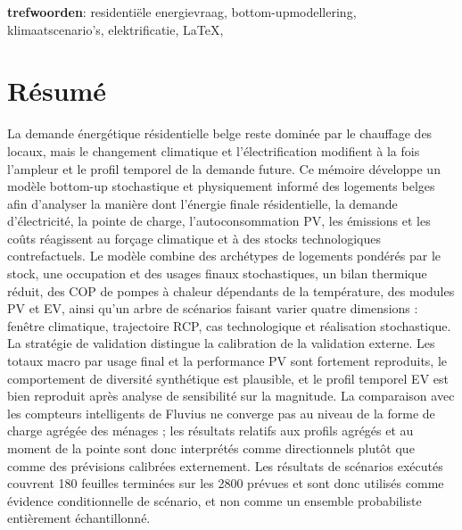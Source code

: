 \bigskip
\textbf{trefwoorden}: residentiële energievraag, bottom-upmodellering, klimaatscenario’s, elektrificatie, \LaTeX, \TikZ


\chapter*{R\'esum\'e}

La demande énergétique résidentielle belge reste dominée par le chauffage des locaux, mais le changement climatique et l’électrification modifient à la fois l’ampleur et le profil temporel de la demande future. Ce mémoire développe un modèle bottom-up stochastique et physiquement informé des logements belges afin d’analyser la manière dont l’énergie finale résidentielle, la demande d’électricité, la pointe de charge, l’autoconsommation PV, les émissions et les coûts réagissent au forçage climatique et à des stocks technologiques contrefactuels. Le modèle combine des archétypes de logements pondérés par le stock, une occupation et des usages finaux stochastiques, un bilan thermique réduit, des COP de pompes à chaleur dépendants de la température, des modules PV et EV, ainsi qu’un arbre de scénarios faisant varier quatre dimensions : fenêtre climatique, trajectoire RCP, cas technologique et réalisation stochastique.
\newline La stratégie de validation distingue la calibration de la validation externe. Les totaux macro par usage final et la performance PV sont fortement reproduits, le comportement de diversité synthétique est plausible, et le profil temporel EV est bien reproduit après analyse de sensibilité sur la magnitude. La comparaison avec les compteurs intelligents de Fluvius ne converge pas au niveau de la forme de charge agrégée des ménages ; les résultats relatifs aux profils agrégés et au moment de la pointe sont donc interprétés comme directionnels plutôt que comme des prévisions calibrées externement. Les résultats de scénarios exécutés couvrent 180 feuilles terminées sur les 2800 prévues et sont donc utilisés comme évidence conditionnelle de scénario, et non comme un ensemble probabiliste entièrement échantillonné.
